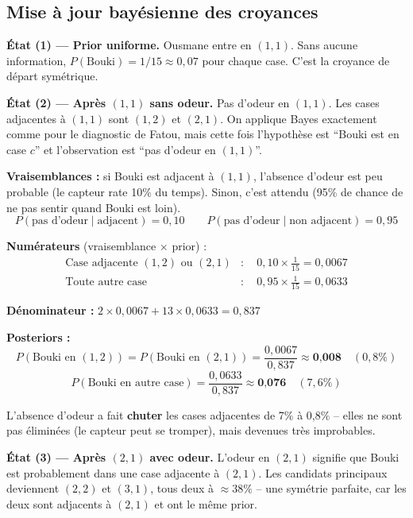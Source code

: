 \documentclass[11pt,a4paper]{article}
\begin{document}
\subsection{Mise à jour bayésienne des croyances}

\textbf{État (1) — Prior uniforme.} Ousmane entre en $(1,1)$. Sans aucune information, $P(\text{Bouki}) = 1/15 \approx 0{,}07$ pour chaque case. C'est la croyance de départ symétrique.

\textbf{État (2) — Après $(1,1)$ sans odeur.} Pas d'odeur en $(1,1)$. Les cases adjacentes à $(1,1)$ sont $(1,2)$ et $(2,1)$. On applique Bayes exactement comme pour le diagnostic de Fatou, mais cette fois l'hypothèse est ``Bouki est en case $c$'' et l'observation est ``pas d'odeur en $(1,1)$''.

\begin{exemplebox}
\textbf{Vraisemblances :} si Bouki est adjacent à $(1,1)$, l'absence d'odeur est peu probable (le capteur rate 10\% du temps). Sinon, c'est attendu (95\% de chance de ne pas sentir quand Bouki est loin).
$$P(\text{pas d'odeur} \mid \text{adjacent}) = 0{,}10 \qquad P(\text{pas d'odeur} \mid \text{non adjacent}) = 0{,}95$$

\textbf{Numérateurs} (vraisemblance $\times$ prior) :
\begin{align*}
\text{Case adjacente } (1,2) \text{ ou } (2,1) &: \quad 0{,}10 \times \tfrac{1}{15} = 0{,}0067 \\
\text{Toute autre case} &: \quad 0{,}95 \times \tfrac{1}{15} = 0{,}0633
\end{align*}

\textbf{Dénominateur :} $2 \times 0{,}0067 + 13 \times 0{,}0633 = 0{,}837$

\textbf{Posteriors :}
$$P(\text{Bouki en }(1,2)) = P(\text{Bouki en }(2,1)) = \frac{0{,}0067}{0{,}837} \approx \textbf{0,008} \quad (0{,}8\%)$$
$$P(\text{Bouki en autre case}) = \frac{0{,}0633}{0{,}837} \approx \textbf{0,076} \quad (7{,}6\%)$$

L'absence d'odeur a fait \textbf{chuter} les cases adjacentes de 7\% à 0,8\% -- elles ne sont pas éliminées (le capteur peut se tromper), mais devenues très improbables.
\end{exemplebox}

\textbf{État (3) — Après $(2,1)$ avec odeur.} L'odeur en $(2,1)$ signifie que Bouki est probablement dans une case adjacente à $(2,1)$. Les candidats principaux deviennent $(2,2)$ et $(3,1)$, tous deux à $\approx 38\%$ -- une symétrie parfaite, car les deux sont adjacents à $(2,1)$ et ont le même prior.
\end{document}
